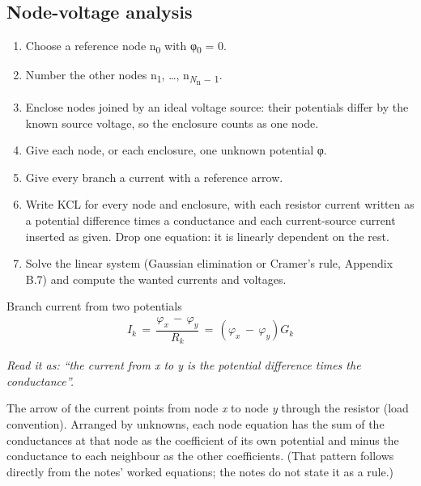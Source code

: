 \documentclass[11pt]{article}
\begin{document}
\begin{keepsection}
\begin{keepsection}
\subsection{Node-voltage analysis}

\begin{enumerate}
\item Choose a reference node n\textsubscript{0} with φ\textsubscript{0} = 0.
\item Number the other nodes n\textsubscript{1}, …, n\textsubscript{\textit{N}\textsubscript{n} \ensuremath{-} 1}.
\item Enclose nodes joined by an ideal voltage source: their potentials differ by the known source voltage, so the enclosure counts as one node.
\item Give each node, or each enclosure, one unknown potential φ.
\item Give every branch a current with a reference arrow.
\item Write KCL for every node and enclosure, with each resistor current written as a potential difference times a conductance and each current-source current inserted as given. Drop one equation: it is linearly dependent on the rest.
\item Solve the linear system (Gaussian elimination or Cramer’s rule, Appendix B.7) and compute the wanted currents and voltages.
\end{enumerate}

\begin{equationcard}{Branch current from two potentials}
\[ \begin{gathered} {I}_{{k}}\, =\, \dfrac{φ_{{x}}\, -\, φ_{{y}}}{{R}_{{k}}}\, =\, (φ_{{x}}\, -\, φ_{{y}}){G}_{{k}} \end{gathered} \]
{\small \emph{Read it as: “the current from x to y is the potential difference times the conductance”.}\par The arrow of the current points from node \textit{x} to node \textit{y} through the resistor (load convention). Arranged by unknowns, each node equation has the sum of the conductances at that node as the coefficient of its own potential and minus the conductance to each neighbour as the other coefficients. (That pattern follows directly from the notes’ worked equations; the notes do not state it as a rule.)}
\end{equationcard}


\end{keepsection}
\end{keepsection}
\end{document}
